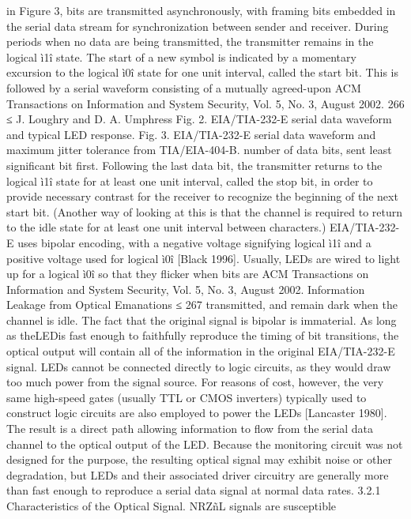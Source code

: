 in Figure 3, bits are transmitted asynchronously, with framing bits 
embedded in the serial data stream for synchronization between sender and 
receiver. During periods when no data are being transmitted, the transmitter 
remains in the logical ì1î state. The start of a new symbol is indicated by a momentary 
excursion to the logical ì0î state for one unit interval, called the start 
bit. This is followed by a serial waveform consisting of a mutually agreed-upon 
ACM Transactions on Information and System Security, Vol. 5, No. 3, August 2002.
266 ≤ J. Loughry and D. A. Umphress 
Fig. 2. EIA/TIA-232-E serial data waveform and typical LED response. 
Fig. 3. EIA/TIA-232-E serial data waveform and maximum jitter tolerance from TIA/EIA-404-B. 
number of data bits, sent least significant bit first. Following the last data bit, 
the transmitter returns to the logical ì1î state for at least one unit interval, 
called the stop bit, in order to provide necessary contrast for the receiver to 
recognize the beginning of the next start bit. (Another way of looking at this 
is that the channel is required to return to the idle state for at least one unit 
interval between characters.) 
EIA/TIA-232-E uses bipolar encoding, with a negative voltage signifying 
logical ì1î and a positive voltage used for logical ì0î [Black 1996]. Usually, 
LEDs are wired to light up for a logical ì0î so that they flicker when bits are 
ACM Transactions on Information and System Security, Vol. 5, No. 3, August 2002.
Information Leakage from Optical Emanations ≤ 267 
transmitted, and remain dark when the channel is idle. The fact that the original 
signal is bipolar is immaterial. As long as theLEDis fast enough to faithfully 
reproduce the timing of bit transitions, the optical output will contain all of the 
information in the original EIA/TIA-232-E signal. 
LEDs cannot be connected directly to logic circuits, as they would draw too 
much power from the signal source. For reasons of cost, however, the very same 
high-speed gates (usually TTL or CMOS inverters) typically used to construct 
logic circuits are also employed to power the LEDs [Lancaster 1980]. The result 
is a direct path allowing information to flow from the serial data channel to the 
optical output of the LED. Because the monitoring circuit was not designed for 
the purpose, the resulting optical signal may exhibit noise or other degradation, 
but LEDs and their associated driver circuitry are generally more than fast 
enough to reproduce a serial data signal at normal data rates. 
3.2.1 Characteristics of the Optical Signal. NRZñL signals are susceptible 
